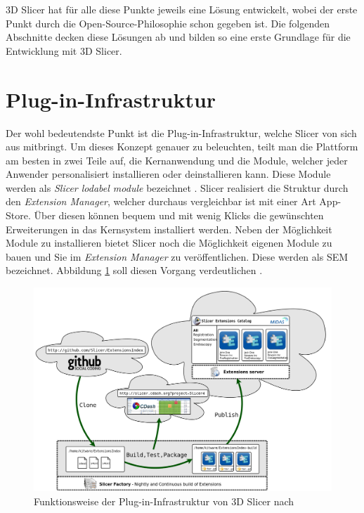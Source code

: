 3D Slicer hat für alle diese Punkte jeweils eine Lösung entwickelt, wobei der erste
Punkt durch die Open-Source-Philosophie schon gegeben ist. Die folgenden
Abschnitte decken diese Lösungen ab und bilden so eine erste Grundlage für die
Entwicklung mit 3D Slicer.

\section{Plug-in-Infrastruktur}
Der wohl bedeutendste Punkt ist die Plug-in-Infrastruktur, welche Slicer von sich
aus mitbringt. Um dieses Konzept genauer zu beleuchten, teilt man die Plattform am
besten in zwei Teile auf, die Kernanwendung und die Module, welcher jeder Anwender
personalisiert installieren oder deinstallieren kann. Diese Module werden als
\textit{Slicer lodabel module} bezeichnet \citep[vgl.][S.~1332]{fedorov2012slicer}.
Slicer realisiert die Struktur durch den \textit{Extension Manager}, welcher durchaus
vergleichbar ist mit einer Art App-Store. Über diesen können bequem und mit
wenig Klicks die gewünschten Erweiterungen in das Kernsystem installiert werden.
Neben der Möglichkeit Module zu installieren bietet Slicer noch die Möglichkeit eigenen
Module zu bauen und Sie im \textit{Extension Manager} zu veröffentlichen. Diese werden
als \ac{SEM} bezeichnet. Abbildung \ref{fig:3d_slicer_extension_index} soll diesen
Vorgang verdeutlichen \citep[vgl.][]{slicer2024}.

\begin{figure}[h]
	\centering
	\includegraphics[width=0.7 \textwidth]{img/slicer_extention_index.png}
	\caption{Funktionsweise der Plug-in-Infrastruktur von 3D Slicer nach \citet{extensionsIndex2024}}
	\label{fig:3d_slicer_extension_index}
\end{figure}

